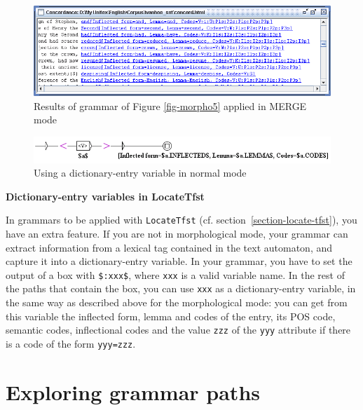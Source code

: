 \begin{figure}[!ht]
\begin{center}
\includegraphics[width=15cm]{resources/img/fig6-17p.png}
\caption{Results of grammar of Figure \ref{fig-morpho5} applied in MERGE mode
\label{fig-morpho6}}
\end{center}
\end{figure}

\begin{figure}[!ht]
\begin{center}
\includegraphics[width=15.5cm]{resources/img/fig6-17q.png}
\caption{Using a dictionary-entry variable in normal mode\label{fig-morpho7}}
\end{center}
\end{figure}


\bigskip
\noindent \textbf{Dictionary-entry variables in LocateTfst}

\noindent In grammars to be applied with \verb+LocateTfst+ (cf. section~\ref{section-locate-tfst}), you have an extra feature. 
If you are not in morphological mode, your grammar can extract information from a lexical tag contained in the text
automaton, and capture it into a dictionary-entry variable.
In your grammar, you have to set the output of a box with \verb+$:xxx$+, where
\verb+xxx+ is a valid variable name. In the rest of the paths that contain the
box, you can use \verb+xxx+ as a dictionary-entry variable, in the same way as
described above for the morphological mode: you can get from this variable the inflected form, lemma and codes
of the entry, its POS code, semantic codes,  inflectional codes and the value
 \verb+zzz+ of the \verb+yyy+ attribute if there is a code of the form \verb+yyy=zzz+.

\section{Exploring grammar paths}

